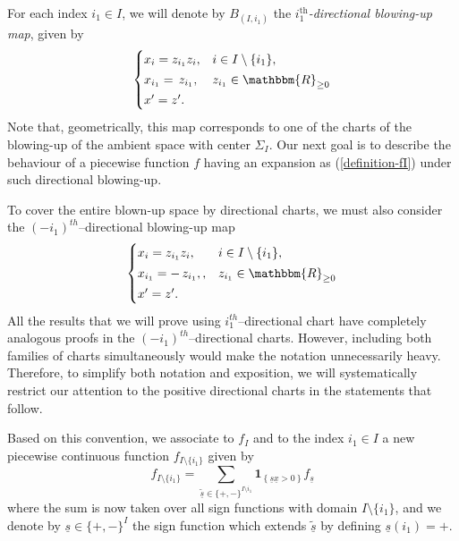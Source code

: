 \documentclass[11pt,psamsfonts]{article}
\newcommand{\tmem}[1]{{\em #1\/}}
\newcommand{\tmmathbf}[1]{\ensuremath{\boldsymbol{#1}}}
\newcommand{\tmop}[1]{\ensuremath{\operatorname{#1}}}
\theoremstyle{definition}
\theoremstyle{remark}
\newcommand{\cR}{\ensuremath{\mathbbm{R}}}
\begin{document}
For each index $i_1 \in I$, we will denote by $B_{(I, i_1)}$ the
{\tmem{$i_1^{\tmop{th}}$-directional blowing-up map}}, given by
\[
\begin{cases}
     x_i = z_{i_1} z_i, & i \in I \setminus \{ i_1 \},\\[2pt]
     x_{i_1} = \, z_{i_1},& z_{i_1} \in \cR_{\ge 0}\\[2pt] 
     x' = z'.
\end{cases}
\]
Note that, geometrically, this map corresponds to one of the charts of the blowing-up of the ambient space with center $\Sigma_I$. Our next goal is to describe the behaviour of a piecewise function $f$ having an
expansion as (\ref{definition-fI}) under such directional blowing-up.

 To cover the entire blown-up space by directional charts, we must also consider the $(-i_1)^{th}$–directional blowing-up map
\[
\begin{cases}
     x_i = z_{i_1} z_i, & i \in I \setminus \{ i_1 \},\\[2pt]
     x_{i_1} = -\, z_{i_1},,& z_{i_1} \in \cR_{\ge 0}\\[2pt]
     x' = z'.
\end{cases}
\]
All the results that we will prove using $i_1^{th}$–directional chart have completely analogous proofs in the $(-i_1)^{th}$–directional charts.  
However, including both families of charts simultaneously would make the notation unnecessarily heavy.  
Therefore, to simplify both notation and exposition, we will systematically restrict our attention to the positive directional charts in the statements that follow.

Based on this convention, we associate to $f_I$ and to the index $i_1\in I$ a new piecewise continuous function $f_{I\setminus \{i_1\}}$ given by
\begin{equation}\label{definition-fI-i1}
f_{I\setminus \{i_1\}} = \sum_{\underline{\tilde s} \in \{ +, - \}^{I\setminus {i_1}}} \tmmathbf{1}_{\left\{ \underline{s} 
     \underline{x} > 0 \right\}} f_{{\underline{s}}}
\end{equation}
where the sum is now taken over all sign functions with domain $I \setminus \{i_1\}$, and we denote by $\underline{{s}} \in \{ +, - \}^I$ the sign
  function which extends $\underline{\tilde s}$ by defining $\underline{s} (i_1) = +$. 
  
\end{document}
